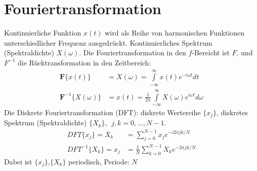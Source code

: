 \section{Fouriertransformation}
Kontinuierliche Funktion $x(t)$ wird als Reihe von harmonischen Funktionen unterschiedlicher Frequenz ausgedrückt. Kontinuierliches Spektrum (Spektraldichte) $X(\omega)$. Die Fouriertransformation in den $f$-Bereicht ist $F$, und $F^{-1}$ die Rücktransformation in den Zeitbereich:
\begin{align}
\textbf{F}\{x(t)\}  & = X(\omega) =\int\limits_{-\infty}^{\infty} x(t) e^{-i\omega t}dt\\
\textbf{F}^{-1}\{X(\omega)\} & = x(t) =\frac {1}{2\pi}\int\limits_{-\infty}^{\infty} X(\omega) e^{i\omega t}d\omega
\end{align}
Die Diskrete Fouriertransformation (DFT): diskrete Wertereihe $\{x_j\}$, diskretes Spektrum (Spektraldichte) $\{X_k\}, ~~ j,k=0,\dots,N-1$.
\begin{align}
DFT\{ x_j \} = X_k & =\sum\limits_{j=0}^{N-1}x_j e^{-i2\pi jk/N} \\
DFT^{-1}\{X_k\} = x_j & =\frac{1}{N} \sum\limits_{k=0}^{N-1}X_k e^{-2\pi jk/N}
\end{align}
Dabei ist $\{x_j\}$,$\{X_k\}$ periodisch, Periode: $N$\\

